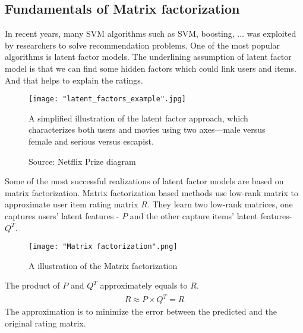 \documentclass[oneside,13pt]{extreport}
\begin{document}
\subsection{Fundamentals of Matrix factorization}

In recent years, many SVM algorithms such as SVM, boosting, ... was exploited by researchers to solve recommendation problems. One of the most popular algorithms is latent factor models. The underlining assumption of latent factor model is that we can find some hidden factors which could link users and items. And that helps to explain the ratings. 

\begin{figure}[h!]
    \centering
    \texttt{[image: "latent\_factors\_example".jpg]} 
    \caption{A simplified illustration of the latent factor approach, which
characterizes both users and movies using two axes—male versus female
and serious versus escapist.}
\caption*{Source: Netflix Prize diagram~\cite{koren2009matrix}}
    \label{fig:LFM_example}
\end{figure}

Some of the most successful realizations of latent factor models are based on matrix factorization. Matrix factorization based methods use low-rank matrix to approximate user item rating matrix $R$. They learn two low-rank matrices, one captures users’ latent features - $P$ and the other capture items’ latent features- $Q^T$. 

\begin{figure}[h!]
    \centering
    \texttt{[image: "Matrix factorization".png]} 
    \caption{A illustration of the Matrix factorization}
    \label{fig:MF}
\end{figure}

The product of $P$ and $Q^T$ approximately equals to $R$. 
\begin{eqnarray}
\label{eq:MF_predict}
R \approx P\times{Q^T} = \widehat R
\end{eqnarray}
 The approximation is to minimize the error between the predicted and the original rating matrix.
  
\end{document}
